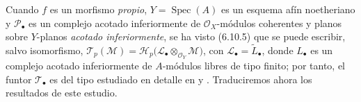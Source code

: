 \begin{env}[7.7.4]
\label{III.7.7.4}
Cuando $f$ es un morfismo \emph{propio}, $Y=\operatorname{Spec}(A)$ es un
esquema afín noetheriano y $\mathscr P_\bullet$ es un complejo acotado
inferiormente de $\mathscr O_X$-módulos coherentes y planos sobre $Y$-planos \emph{acotado inferiormente}, se ha
visto (6.10.5) que se puede escribir, salvo isomorfismo,
$\mathscr T_p(\mathscr M)=\mathscr H_p\bigl(\mathscr L_\bullet\otimes_{\mathscr O_Y}\mathscr M\bigr)$,
con $\mathscr L_\bullet=\widetilde{L}_\bullet$,
donde $L_\bullet$ es un complejo acotado inferiormente de $A$-módulos libres
de tipo finito; por tanto, el funtor $\mathscr T_\bullet$ es del tipo estudiado
en detalle en  y . Traduciremos ahora los resultados
de este estudio.
\end{env}

